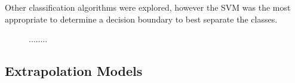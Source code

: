 Other classification algorithms were explored, however the SVM was the most appropriate to determine a decision boundary to best separate the classes.

\begin{figure}[htbp!] 
    \centering
    \hfill%
    \caption{........}
    \label{fig:KL-distance}
\end{figure}





\subsection{Extrapolation Models}
\label{chapter-6-extrapolation}
